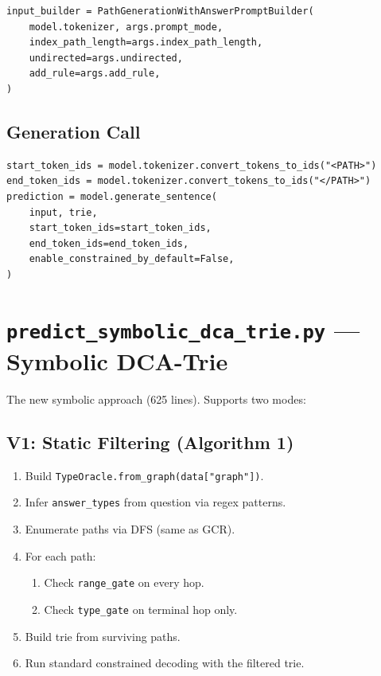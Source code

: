 \documentclass[11pt,a4paper,oneside,openany]{book}
\theoremstyle{definition}
\newcommand{\code}[1]{\texttt{#1}}
\begin{document}
\begin{lstlisting}
input_builder = PathGenerationWithAnswerPromptBuilder(
    model.tokenizer, args.prompt_mode,
    index_path_length=args.index_path_length,
    undirected=args.undirected,
    add_rule=args.add_rule,
)
\end{lstlisting}

\subsection{Generation Call}

\begin{lstlisting}
start_token_ids = model.tokenizer.convert_tokens_to_ids("<PATH>")
end_token_ids = model.tokenizer.convert_tokens_to_ids("</PATH>")
prediction = model.generate_sentence(
    input, trie,
    start_token_ids=start_token_ids,
    end_token_ids=end_token_ids,
    enable_constrained_by_default=False,
)
\end{lstlisting}

\section{\texttt{predict\_symbolic\_dca\_trie.py} --- Symbolic DCA-Trie}

The new symbolic approach (625 lines). Supports two modes:

\subsection{V1: Static Filtering (Algorithm 1)}

\begin{enumerate}
	\item Build \code{TypeOracle.from\_graph(data["graph"])}.
	\item Infer \code{answer\_types} from question via regex patterns.
	\item Enumerate paths via DFS (same as GCR).
	\item For each path:
	      \begin{enumerate}
		      \item Check \code{range\_gate} on every hop.
		      \item Check \code{type\_gate} on terminal hop only.
	      \end{enumerate}
	\item Build trie from surviving paths.
	\item Run standard constrained decoding with the filtered trie.
\end{enumerate}
\end{document}
